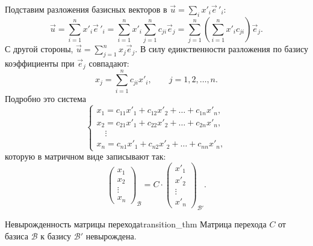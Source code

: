 \documentclass[12pt,a4paper]{article}
\begin{document}
Подставим разложения базисных векторов в $\vec{u} = \sum_i x'_i
\vec{e}\,'_i$:
\[
  \vec{u} = \sum_{i=1}^{n} x'_i \vec{e}\,'_i = \sum_{i=1}^{n} x'_i
  \sum_{j=1}^{n} c_{ji}\vec{e}_j = \sum_{j=1}^{n}
  \left(\sum_{i=1}^{n} x'_i c_{ji}\right)\vec{e}_j.
\]
С другой стороны, $\vec{u} = \sum_{j=1}^{n} x_j \vec{e}_j$. В силу
единственности разложения по базису коэффициенты при $\vec{e}_j$
совпадают:
\begin{equation}
  x_j = \sum_{i=1}^{n} c_{ji} x'_i, \qquad j = 1, 2, \dots, n.
  \tag{16.5}
\end{equation}
Подробно это система
\begin{equation}
  \begin{cases}
    x_1 = c_{11}x'_1 + c_{12}x'_2 + \dots + c_{1n}x'_n, \\
    x_2 = c_{21}x'_1 + c_{22}x'_2 + \dots + c_{2n}x'_n, \\
    \quad \vdots \\
    x_n = c_{n1}x'_1 + c_{n2}x'_2 + \dots + c_{nn}x'_n,
  \end{cases}
  \tag{16.6}
\end{equation}
которую в матричном виде записывают так:
\begin{equation}
  \begin{pmatrix} x_1 \\ x_2 \\ \vdots \\ x_n
  \end{pmatrix}_{\mathcal{B}}
  = C \cdot
  \begin{pmatrix} x'_1 \\ x'_2 \\ \vdots \\ x'_n
  \end{pmatrix}_{\mathcal{B}'}.
  \tag{16.7}
\end{equation}

\begin{theorem}{Невырожденность матрицы перехода}{transition_thm}
  Матрица перехода $C$ от базиса $\mathcal{B}$ к базису $\mathcal{B}'$
  невырождена.
\end{theorem}
\end{document}
